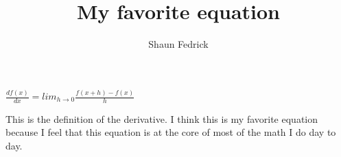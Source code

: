 \documentclass [11pt]{article}
\title{My favorite equation}
\author{Shaun Fedrick}
\begin{document}
\maketitle
\begin{math}\frac{df(x)}{dx}= lim_{h \rightarrow 0} \frac{f(x+h)-f(x)}{h}\end{math}
\\
\par{
This is the definition of the derivative. I think this is my favorite equation because I feel that this equation is at the core of most of the math I do day to day. 
}
\end{document}
